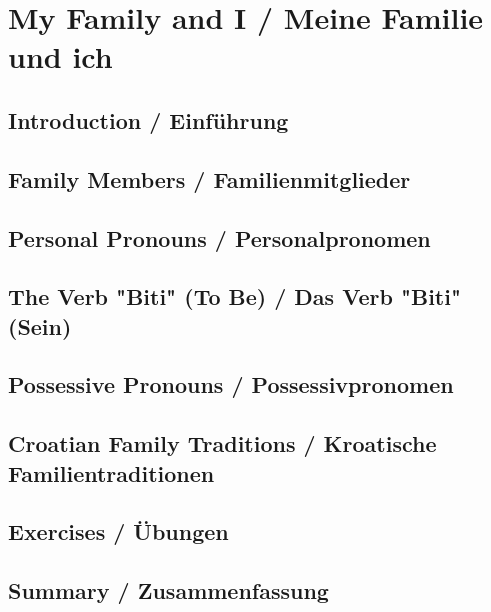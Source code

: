 \chapter{My Family and I / Meine Familie und ich}

\section{Introduction / Einführung}

\section{Family Members / Familienmitglieder}

\section{Personal Pronouns / Personalpronomen}

\section{The Verb "Biti" (To Be) / Das Verb "Biti" (Sein)}

\section{Possessive Pronouns / Possessivpronomen}

\section{Croatian Family Traditions / Kroatische Familientraditionen}

\section{Exercises / Übungen}

\section{Summary / Zusammenfassung}
